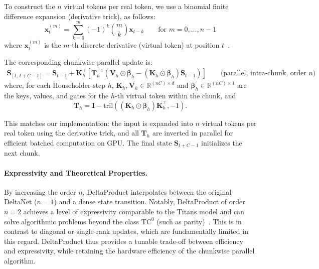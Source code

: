 \documentclass[10pt,a4paper]{article}
\begin{document}
To construct the $n$ virtual tokens per real token, we use a binomial finite difference expansion (derivative trick), as follows:
\begin{equation}
    \mathbf{x}^{(m)}_t = \sum_{k=0}^m (-1)^k \binom{m}{k} \mathbf{x}_{t-k}
    \qquad \text{for } m=0,\ldots,n-1
\end{equation}
where $\mathbf{x}^{(m)}_t$ is the $m$-th discrete derivative (virtual token) at position $t$~\cite{behrouz2025s}.

The corresponding chunkwise parallel update is:
\begin{align}
    \mathbf{S}_{[t,\,t+C-1]} = \mathbf{S}_{t-1} + \mathbf{K}_h^\top
    \left[ \mathbf{T}_h^{-1}
    \left( \mathbf{V}_h \odot \boldsymbol{\beta}_h - (\mathbf{K}_h \odot \boldsymbol{\beta}_h) \mathbf{S}_{t-1} \right) \right]
    \qquad \text{(parallel, intra-chunk, order $n$)}
\end{align}
where, for each Householder step $h$, $\mathbf{K}_h, \mathbf{V}_h \in \mathbb{R}^{(nC) \times d}$ and $\boldsymbol{\beta}_h \in \mathbb{R}^{(nC) \times 1}$ are the keys, values, and gates for the $h$-th virtual token within the chunk, and
\begin{equation}
    \mathbf{T}_h = \mathbf{I} - \mathrm{tril}\left((\mathbf{K}_h \odot \boldsymbol{\beta}_h) \mathbf{K}_h^\top, -1\right).
\end{equation}

This matches our implementation: the input is expanded into $n$ virtual tokens per real token using the derivative trick, and all $\mathbf{T}_h$ are inverted in parallel for efficient batched computation on GPU. The final state $\mathbf{S}_{t+C-1}$ initializes the next chunk.

\paragraph{Expressivity and Theoretical Properties.}
By increasing the order $n$, DeltaProduct interpolates between the original DeltaNet ($n=1$) and a dense state transition. Notably, DeltaProduct of order $n=2$ achieves a level of expressivity comparable to the Titans model and can solve algorithmic problems beyond the class $\mathrm{TC}^0$ (such as parity)~\cite{siems2025deltaproduct, merrill2024illusion}. This is in contrast to diagonal or single-rank updates, which are fundamentally limited in this regard. DeltaProduct thus provides a tunable trade-off between efficiency and expressivity, while retaining the hardware efficiency of the chunkwise parallel algorithm.
\end{document}
